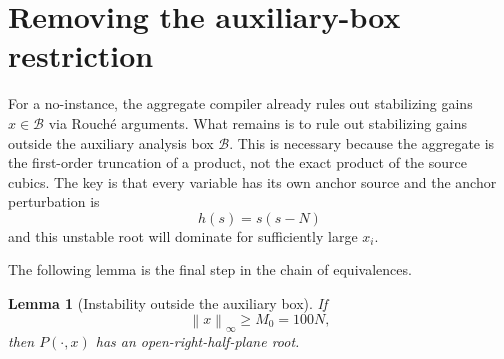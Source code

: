\documentclass[final,5p,times,twocolumn]{elsarticle}
\newcommand{\norm}[1]{\left\|#1\right\|}
\newtheorem{lemma}[theorem]{Lemma}
\begin{document}
\section{Removing the auxiliary-box restriction}\label{sec:escape}

For a no-instance, the aggregate compiler already rules out stabilizing gains $x\in\mathcal B$ via Rouch\'e arguments. What remains is to rule out stabilizing gains outside the auxiliary analysis box $\mathcal B$. This is necessary because the aggregate is the first-order truncation of a product, not the exact product of the source cubics. The key is that every variable has its own anchor source and the anchor perturbation is
\[
h(s)=s(s-N)
\]
and this unstable root will dominate for sufficiently large $x_i$.

The following lemma is the final step in the chain of equivalences.
\begin{lemma}[Instability outside the auxiliary box]\label{lem:escape}
If
\[
\norm{x}_\infty\ge M_0=100N,
\]
then $P(\cdot,x)$ has an open-right-half-plane root.
\end{lemma}
\end{document}
